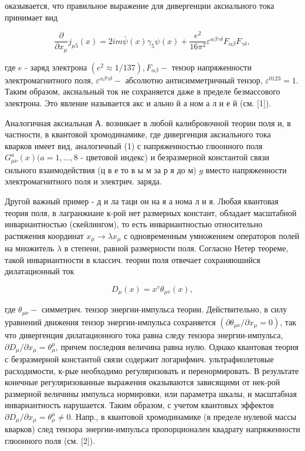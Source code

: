 \documentclass[10pt]{article}
\begin{document}
оказывается, что правильное выражение для дивергенции аксиального тока принимает вид



\[

\frac{\partial}{\partial x_{\mu}} j_{\mu 5}(x)=2 i m \bar{\psi}(x) \gamma_{5} \psi(x)+\frac{e^{2}}{16 \pi^{2}} \varepsilon^{\alpha \beta \gamma \delta} F_{\alpha \beta} F_{\gamma \delta},

\]



где $e$ - заряд электрона $\left(e^{2} \approx 1 / 137\right), F_{\alpha \beta}-$ тензор напряженности электромагнитного поля, $\varepsilon^{\alpha \beta \gamma \delta}-$ абсолютно антисимметричный тензор, $\varepsilon^{0123}=1$. Таким образом, аксиальный ток не сохраняется даже в пределе безмассового электрона. Это явление называется акс и ально й а ном а л и е й (см. [1]).



Аналогичная аксиальная А. возникает в любой калибровочной теории поля и, в частности, в квантовой хромодинамике, где дивергенция аксиального тока кварков имеет вид, аналогичный (1) с напряженностью глюонного поля $G_{\mu \nu}^{a}(x)(a=1, \ldots, 8$ - цветовой индекс) и безразмерной константой связи сильного взаимодействия (ц в е то в ы м за р я до м) $g$ вместо напряженности электромагнитного поля и электрич. заряда.



Другой важный пример - д и ла таци он на я а нома л и я. Любая квантовая теория поля, в лагранжиане к-рой нет размерных констант, обладает масштабной инвариантностью (скейлингом), то есть инвариантностью относительно растяжения координат $x_{\mu} \rightarrow \lambda x_{\mu}$ с одновременным умножением операторов полей на множитель $\lambda$ в степени, равной размерности поля. Согласно Нетер теореме, такой инвариантности в классич. теории поля отвечает сохраняюшийся дилатационный ток



\[

D_{\mu}(x)=x^{v} \theta_{\mu v}(x),

\]



где $\theta_{\mu \nu}-$ симметрич. тензор энергии-импульса теории. Действительно, в силу уравнений движения тензор энергии-импульса сохраняется $\left(\partial \theta_{\mu \nu} / \partial x_{\mu}=0\right)$, так что дивергенция дилатационного тока равна следу тензора энергии-импульса, $\partial D_{\mu} / \partial x_{\mu}=\theta_{\mu}^{\mu}$, причем последняя величина равна нулю. Однако квантовая теория с безразмерной константой связи содержит логарифмич. ультрафиолетовые расходимости, к-рые необходимо регуляризовать и перенормировать. В результате конечные регуляризованные выражения оказываются зависящими от нек-рой размерной величины импульса нормировки, или параметра шкалы, и масштабная инвариантность нарушается. Таким образом, с учетом квантовых эффектов $\partial D_{\mu} / \partial x_{\mu}=\theta_{\mu}^{\mu} \neq 0$. Напр., в квантовой хромодинамике (в пределе нулевой массы кварков) след тензора энергии-импульса пропорционален квадрату напряженности глюонного поля (см. [2]).
\end{document}
